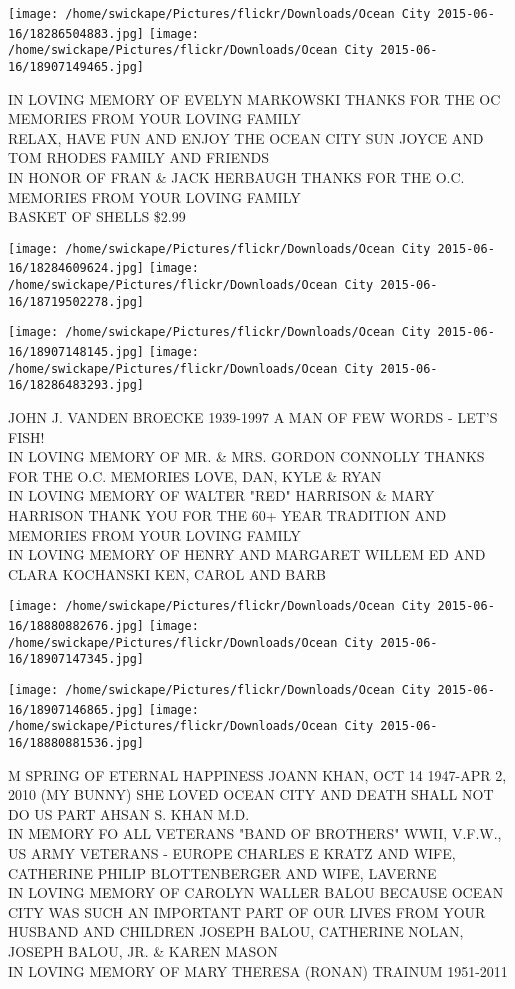 \documentclass[10pt,letterpaper]{article}
\begin{document}
\texttt{[image: /home/swickape/Pictures/flickr/Downloads/Ocean City 2015-06-16/18286504883.jpg]}
\texttt{[image: /home/swickape/Pictures/flickr/Downloads/Ocean City 2015-06-16/18907149465.jpg]}

IN LOVING MEMORY OF EVELYN MARKOWSKI THANKS FOR THE OC MEMORIES FROM YOUR LOVING FAMILY\\
RELAX, HAVE FUN AND ENJOY THE OCEAN CITY SUN JOYCE AND TOM RHODES FAMILY AND FRIENDS\\
IN HONOR OF FRAN \& JACK HERBAUGH THANKS FOR THE O.C. MEMORIES FROM YOUR LOVING FAMILY\\
BASKET OF SHELLS \$2.99\\
\pagebreak

\texttt{[image: /home/swickape/Pictures/flickr/Downloads/Ocean City 2015-06-16/18284609624.jpg]}
\texttt{[image: /home/swickape/Pictures/flickr/Downloads/Ocean City 2015-06-16/18719502278.jpg]}

\texttt{[image: /home/swickape/Pictures/flickr/Downloads/Ocean City 2015-06-16/18907148145.jpg]}
\texttt{[image: /home/swickape/Pictures/flickr/Downloads/Ocean City 2015-06-16/18286483293.jpg]}

JOHN J. VANDEN BROECKE 1939{-}1997 A MAN OF FEW WORDS {-} LET'S FISH!\\
IN LOVING MEMORY OF MR. \& MRS. GORDON CONNOLLY THANKS FOR THE O.C. MEMORIES LOVE, DAN, KYLE \& RYAN\\
IN LOVING MEMORY OF WALTER "RED" HARRISON \& MARY HARRISON THANK YOU FOR THE 60+ YEAR TRADITION AND MEMORIES FROM YOUR LOVING FAMILY\\
IN LOVING MEMORY OF HENRY AND MARGARET WILLEM ED AND CLARA KOCHANSKI KEN, CAROL AND BARB\\
\pagebreak

\texttt{[image: /home/swickape/Pictures/flickr/Downloads/Ocean City 2015-06-16/18880882676.jpg]}
\texttt{[image: /home/swickape/Pictures/flickr/Downloads/Ocean City 2015-06-16/18907147345.jpg]}

\texttt{[image: /home/swickape/Pictures/flickr/Downloads/Ocean City 2015-06-16/18907146865.jpg]}
\texttt{[image: /home/swickape/Pictures/flickr/Downloads/Ocean City 2015-06-16/18880881536.jpg]}

M SPRING OF ETERNAL HAPPINESS JOANN KHAN, OCT 14 1947{-}APR 2, 2010 (MY BUNNY) SHE LOVED OCEAN CITY AND DEATH SHALL NOT DO US PART AHSAN S. KHAN M.D.\\
IN MEMORY FO ALL VETERANS "BAND OF BROTHERS" WWII, V.F.W., US ARMY VETERANS {-} EUROPE CHARLES E KRATZ AND WIFE, CATHERINE PHILIP BLOTTENBERGER AND WIFE, LAVERNE\\
IN LOVING MEMORY OF CAROLYN WALLER BALOU BECAUSE OCEAN CITY WAS SUCH AN IMPORTANT PART OF OUR LIVES FROM YOUR HUSBAND AND CHILDREN JOSEPH BALOU, CATHERINE NOLAN, JOSEPH BALOU, JR. \& KAREN MASON\\
IN LOVING MEMORY OF MARY THERESA (RONAN) TRAINUM 1951{-}2011\\
\pagebreak
\end{document}
